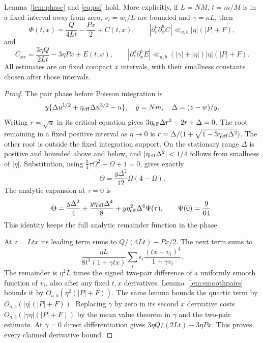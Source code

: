 \begin{proposition}\label{prop:exactphaseproof}
Lemma~\ref{lem:phase} and \eqref{eq:psi} hold. More explicitly, if
$L=NM$, $t=m/M$ is in a fixed interval away from zero, $v_i=w_i/L$
are bounded and $\gamma=\kappa L$, then
\[
 \Phi(t,x)=\frac Q{4Lt}-\frac{Px}{2}+C(t,x),\qquad
 |\partial_t^a\partial_x^b C|\ll_{a,b}|\eta|(|P|+F),
\]
and
\[
 C_{xx}=\frac{3\eta Q}{2Lt}-3\eta Px+E(t,x),\qquad
 |\partial_t^a\partial_x^b E|
 \ll_{a,b}(|\gamma|+|\eta|)|\eta|(|P|+F).
\]
All estimates are on fixed compact $x$ intervals, with their smallness
constants chosen after those intervals.
\end{proposition}
\begin{proof}
The pair phase before Poisson integration is
\[
 y\{\Delta u^{1/2}+\eta_{\rm eff}\Delta u^{3/2}-u\},\quad
 y=Nm,\quad \Delta=(z-w)/y.
\]
Writing $r=\sqrt u$ in its critical equation gives
$3\eta_{\rm eff}\Delta r^2-2r+\Delta=0$.
The root remaining in a fixed positive interval as $\eta\to0$ is
$r=\Delta/(1+\sqrt{1-3\eta_{\rm eff}\Delta^2})$.
The other root is outside the fixed integration support. On the
stationary range $\Delta$ is positive and bounded above and below,
and $|\eta_{\rm eff}\Delta^2|<1/4$ follows from smallness of $|\eta|$.
Substitution, using $\frac34\tau\Omega^2-\Omega+1=0$, gives exactly
\[
 \Theta=\frac{y\Delta^2}{12}\Omega(4-\Omega).
\]
The analytic expansion at $\tau=0$ is
\[
 \Theta=\frac{y\Delta^2}{4}
       +\frac{y\eta_{\rm eff}\Delta^4}{8}
       +y\eta_{\rm eff}^2\Delta^6\Psi(\tau),
 \qquad \Psi(0)=\frac9{64}.
\]
This identity keeps the full analytic remainder function in the phase.

At $z=Ltx$ its leading term sums to $Q/(4Lt)-Px/2$.
The next term sums to
\[
 \frac{\eta L}{8t^3(1+\gamma tx)}
 \sum_i\epsilon_i\frac{(tx-v_i)^4}{1+\gamma v_i}.
\]
The remainder is $\eta^2L$ times the signed two-pair difference of a
uniformly smooth function of $v_i$, also after any fixed $t,x$
derivatives. Lemma~\ref{lem:smoothpairs} bounds it by
$O_{a,b}(\eta^2(|P|+F))$. The same lemma bounds the quartic term by
$O_{a,b}(|\eta|(|P|+F))$.
Replacing $\gamma$ by zero in its second $x$ derivative costs
$O_{a,b}(|\gamma\eta|(|P|+F))$ by the mean value theorem in $\gamma$
and the two-pair estimate. At $\gamma=0$ direct differentiation gives
$3\eta Q/(2Lt)-3\eta Px$. This proves every claimed derivative bound.
\end{proof}


